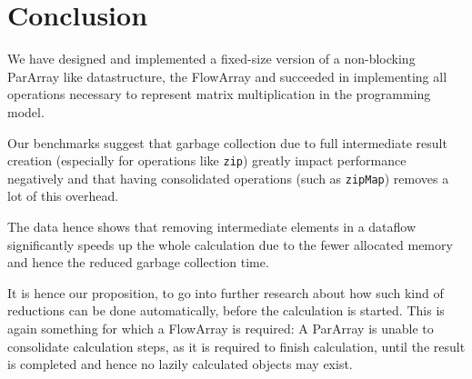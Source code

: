 \documentclass[runningheads,a4paper,fleqn]{llncs}
\begin{document}
\section{Conclusion}
\label{sec:conclusion}

We have designed and implemented a fixed-size version of a non-blocking
ParArray like datastructure, the FlowArray and succeeded in
implementing all operations necessary to represent matrix
multiplication in the programming model.

Our benchmarks suggest that garbage collection due to full
intermediate result creation (especially for operations like
\texttt{zip}) greatly impact performance negatively and that having
consolidated operations (such as \texttt{zipMap}) removes a lot of
this overhead.

The data hence shows that removing intermediate elements in a dataflow
significantly speeds up the whole calculation due to the fewer
allocated memory and hence the reduced garbage collection time.

It is hence our proposition, to go into further research about how
such kind of reductions can be done automatically, before the
calculation is started. This is again something for which a FlowArray
is required: A ParArray is unable to consolidate calculation steps, as
it is required to finish calculation, until the result is completed
and hence no lazily calculated objects may exist.



\end{document}
